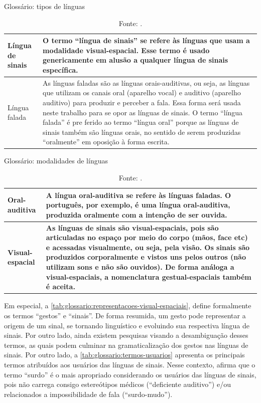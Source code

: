 \begin{table}[htbp]
\caption{Glossário: tipos de línguas}
\label{tab:glossario:tipos-linguas}
\begin{tabularx}{\textwidth}{l|X} \hline
\textbf{Língua de sinais} & \textbf{O termo ``língua de sinais'' se refere às línguas que usam a modalidade visual-espacial. Esse termo é usado genericamente em alusão a qualquer língua de sinais específica.} \\ \hline
Língua falada & As línguas faladas são as línguas orais-auditivas, ou seja, as línguas que utilizam os canais oral (aparelho vocal) e auditivo (aparelho auditivo) para produzir e perceber a fala. Essa forma será usada neste trabalho para se opor as línguas de sinais. O termo ``língua falada'' é pre ferido ao termo ``língua oral'' porque as línguas de sinais também são línguas orais, no sentido de serem produzidas ``oralmente'' em oposição à forma escrita. \\ \hline
\end{tabularx}
\caption*{Fonte: .}
\end{table}

\begin{table}[htbp]
\caption{Glossário: modalidades de línguas}
\label{tab:glossario:modalidades-linguas}
\begin{tabularx}{\textwidth}{l|X} \hline
Oral-auditiva & A língua oral-auditiva se refere às línguas faladas. O português, por exemplo, é uma língua oral-auditiva, produzida oralmente com a intenção de ser ouvida. \\ \hline
\textbf{Visual-espacial} & \textbf{As línguas de sinais são visual-espaciais, pois são articuladas no espaço por meio do corpo (mãos, face etc) e acessadas visualmente, ou seja, pela visão. Os sinais são produzidos corporalmente e vistos uns pelos outros (não utilizam sons e não são ouvidos). De forma análoga a visual-espaciais, a nomenclatura gestual-espaciais também é aceita.} \\ \hline
\end{tabularx}
\caption*{Fonte: .}
\end{table}

Em especial, a \autoref{tab:glossario:representacoes-visual-espaciais}, define formalmente os termos ``gestos'' e ``sinais''. De forma resumida, um gesto pode representar a origem de um sinal, se tornando linguístico e evoluindo sua respectiva língua de sinais. Por outro lado, ainda existem pesquisas visando a desambiguação desses termos, as quais podem culminar na gramaticalização dos gestos nas línguas de sinais. Por outro lado, a \autoref{tab:glossario:termos-usuarios} apresenta os principais termos atribuídos aos usuários das línguas de sinais. Nesse contexto,  afirma que o termo ``surdo'' é o mais apropriado considerando os usuários das línguas de sinais, pois não carrega consigo estereótipos médicos (``deficiente auditivo'') e/ou relacionados a impossibilidade de fala (``surdo-mudo'').

